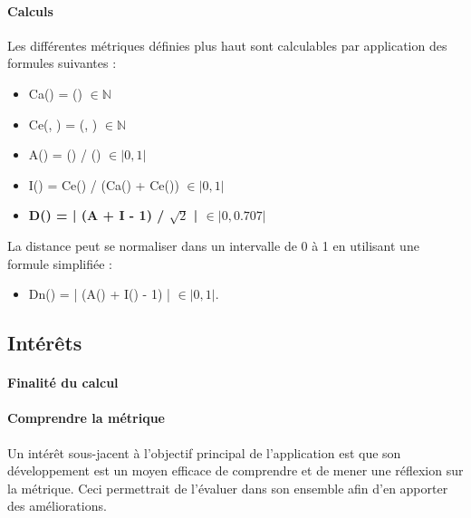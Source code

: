 \documentclass{scrartcl}
\begin{document}
    \paragraph{Calculs}Les différentes métriques définies plus haut sont calculables par application des formules suivantes : 
    \begin{itemize}
        \item Ca(\category{}) = \dependantClasses{}(\category{}) $\in \mathbb{N}$
        
        \item Ce(\category{}, \categoryUniverse{}) = \dependedClasses{}(\category{}, \categoryUniverse{}) $\in \mathbb{N}$
        
        \item A(\category{}) = 
        \numberOfabstractMethod{}(\category{}) /
        {\numberOfMethod{}(\category{})} $\in \lvert 0, 1\rvert$

        \item I(\category{}) = Ce(\category{}) / (Ca(\category{}) + Ce(\category{})) $\in \lvert 0, 1\rvert$
        
        \item \textbf{D(\category{}) = | (A + I - 1) / $\sqrt{2}$ | $\in \lvert 0, 0.707\rvert$}

    \end{itemize}
    
La distance peut se normaliser dans un intervalle de 0 à 1 en utilisant une formule simplifiée :
\begin{itemize}
    \item Dn(\category{}) = | (A(\category{}) + I(\category{}) - 1) | $\in \lvert 0, 1\rvert$.
\end{itemize}

\subsection{Intérêts}

    \paragraph{Finalité du calcul}
    
    \paragraph{Comprendre la métrique}Un intérêt sous-jacent à l'objectif principal de l'application est que son développement est un moyen efficace de comprendre et de mener une réflexion sur la métrique. Ceci permettrait de l'évaluer dans son ensemble afin d'en apporter des améliorations.
\end{document}
